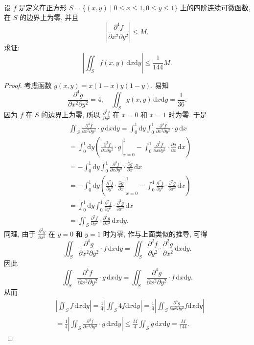 \documentclass[../../main.tex]{subfiles}
\begin{document}
\begin{example}
设 \( f \) 是定义在正方形 \( S = \{ (x,y) \mid 0 \leqslant x \leqslant 1, 0 \leqslant y \leqslant 1 \} \) 上的四阶连续可微函数, 在 \( S \) 的边界上为零, 并且
\[
\left| \frac{\partial^4 f}{\partial x^2 \partial y^2} \right| \leqslant M.
\]
求证: 
\[
\left| \iint_S f(x,y) \, \mathrm{d}x\mathrm{d}y \right| \leqslant \frac{1}{144} M.
\]
\end{example}
\begin{proof}
考虑函数 \( g(x,y) = x(1 - x)y(1 - y) \). 易知
\[
\frac{\partial^4 g}{\partial x^2 \partial y^2} = 4, \quad \iint_S g(x,y) \, \mathrm{d}x\mathrm{d}y = \frac{1}{36}.
\]
因为 \( f \) 在 \( S \) 的边界上为零, 所以 \( \frac{\partial^2 f}{\partial y^2} \) 在 \( x = 0 \) 和 \( x = 1 \) 时为零. 于是
\begin{align*}
&\iint_S{\frac{\partial ^4f}{\partial x^2\partial y^2}}\cdot g\,\mathrm{d}x\mathrm{d}y=\int_0^1{\mathrm{d}y\int_0^1{\frac{\partial ^4f}{\partial x^2\partial y^2}}}\cdot g\,\mathrm{d}x
\\
&=\int_0^1{\mathrm{d}y\left( \left. \frac{\partial ^3f}{\partial x\partial y^2}\cdot g \right|_{x=0}^{1}-\int_0^1{\frac{\partial ^3f}{\partial x\partial y^2}}\cdot \frac{\partial g}{\partial x}\,\mathrm{d}x \right)}
\\
&=-\int_0^1{\mathrm{d}y\int_0^1{\frac{\partial ^3f}{\partial x\partial y^2}}}\cdot \frac{\partial g}{\partial x}\,\mathrm{d}x
\\
&=-\int_0^1{\mathrm{d}y\left( \left. \frac{\partial ^2f}{\partial y^2}\cdot \frac{\partial g}{\partial x} \right|_{x=0}^{1}-\int_0^1{\frac{\partial ^2f}{\partial y^2}}\cdot \frac{\partial ^2g}{\partial x^2}\,\mathrm{d}x \right)}
\\
&=\int_0^1{\mathrm{d}y\int_0^1{\frac{\partial ^2f}{\partial y^2}}}\cdot \frac{\partial ^2g}{\partial x^2}\,\mathrm{d}x
\\
&=\iint_S{\frac{\partial ^2f}{\partial y^2}}\cdot \frac{\partial ^2g}{\partial x^2}\,\mathrm{d}x\mathrm{d}y.
\end{align*}
同理, 由于 \( \frac{\partial^2 g}{\partial x^2} \) 在 \( y = 0 \) 和 \( y = 1 \) 时为零, 作与上面类似的推导, 可得
\[
\iint_S \frac{\partial^4 g}{\partial x^2 \partial y^2} \cdot f \, \mathrm{d}x\mathrm{d}y = \iint_S \frac{\partial^2 f}{\partial y^2} \cdot \frac{\partial^2 g}{\partial x^2} \, \mathrm{d}x\mathrm{d}y.
\]
因此
\[
\iint_S \frac{\partial^4 f}{\partial x^2 \partial y^2} \cdot g \, \mathrm{d}x\mathrm{d}y = \iint_S \frac{\partial^4 g}{\partial x^2 \partial y^2} \cdot f \, \mathrm{d}x\mathrm{d}y.
\]
从而
\begin{align*}
&\left| \iint_S{f\,\mathrm{d}x\mathrm{d}y} \right|=\frac{1}{4}\left| \iint_S{4f\mathrm{d}x\mathrm{d}y} \right|=\frac{1}{4}\left| \iint_S{\frac{\partial ^4g}{\partial x^2\partial y^2}f\mathrm{d}x\mathrm{d}y} \right|
\\
&=\frac{1}{4}\left| \iint_S{\frac{\partial ^4f}{\partial x^2\partial y^2}\cdot g\,\mathrm{d}x\mathrm{d}y} \right|\leqslant \frac{M}{4}\iint_S{g\,\mathrm{d}x\mathrm{d}y}=\frac{M}{144}.
\end{align*}

\end{proof}
\end{document}
